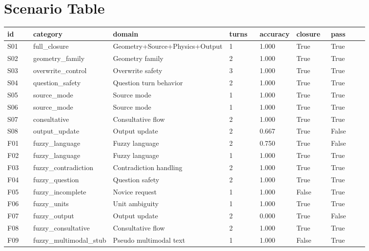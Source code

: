 \documentclass[11pt]{ctexart}
\begin{document}
\section{Scenario Table}
\begin{longtable}{p{0.08\linewidth}p{0.15\linewidth}p{0.22\linewidth}p{0.09\linewidth}p{0.10\linewidth}p{0.10\linewidth}p{0.12\linewidth}}
\toprule
id & category & domain & turns & accuracy & closure & pass \\
\midrule
S01 & full\_closure & Geometry+Source+Physics+Output & 1 & 1.000 & True & True \\
S02 & geometry\_family & Geometry family & 2 & 1.000 & True & True \\
S03 & overwrite\_control & Overwrite safety & 3 & 1.000 & True & True \\
S04 & question\_safety & Question turn behavior & 2 & 1.000 & True & True \\
S05 & source\_mode & Source mode & 1 & 1.000 & True & True \\
S06 & source\_mode & Source mode & 1 & 1.000 & True & True \\
S07 & consultative & Consultative flow & 2 & 1.000 & True & True \\
S08 & output\_update & Output update & 2 & 0.667 & True & False \\
F01 & fuzzy\_language & Fuzzy language & 2 & 0.750 & True & False \\
F02 & fuzzy\_language & Fuzzy language & 1 & 1.000 & True & True \\
F03 & fuzzy\_contradiction & Contradiction handling & 2 & 1.000 & True & True \\
F04 & fuzzy\_question & Question safety & 2 & 1.000 & True & True \\
F05 & fuzzy\_incomplete & Novice request & 1 & 1.000 & False & True \\
F06 & fuzzy\_units & Unit ambiguity & 1 & 1.000 & True & True \\
F07 & fuzzy\_output & Output update & 2 & 0.000 & True & False \\
F08 & fuzzy\_consultative & Consultative flow & 2 & 1.000 & True & True \\
F09 & fuzzy\_multimodal\_stub & Pseudo multimodal text & 1 & 1.000 & False & True \\
\bottomrule
\end{longtable}
\end{document}
